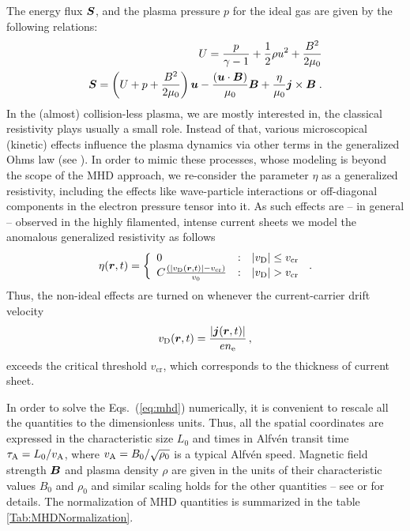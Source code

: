 The energy flux $\boldsymbol{S}$, and the plasma pressure $p$ for the ideal gas are given by the following relations:
\begin{eqnarray}
U=\frac{p}{\gamma-1}+\frac{1}{2}\rho u^2+\frac{B^2}{2\mu_0}\\
\boldsymbol{S}=\left(U+p+\frac{B^2}{2\mu_0}\right)\boldsymbol{u}- \frac{(\boldsymbol{u}\cdot\boldsymbol{B})}{\mu_0}\boldsymbol{B}+\frac{\eta}{\mu_0}\boldsymbol{j}\times\boldsymbol{B} \;.
\end{eqnarray}
In the (almost) collision-less plasma, we are mostly interested in, the classical resistivity plays usually a small role. Instead of that, various microscopical
(kinetic) effects influence the plasma dynamics via other terms in the generalized Ohms law (see \citet{Buchner+Elkina:2006}). In order to mimic these
processes, whose modeling is beyond the scope of the MHD approach, we re-consider the parameter $\eta$ as a generalized resistivity, including the effects like
wave-particle interactions or off-diagonal components in the electron pressure tensor into it. As such effects are -- in general -- observed in the highly
filamented, intense current sheets we model the anomalous generalized resistivity as follows
\begin{equation}
\eta(\vct r,t)=\left\{
  \begin{array}{lll}
    0 & : & |v_{\rm D}|\le v_\mathrm{cr}\\
    C\frac{\left(|v_{\rm D}(\vct r,t)|-v_\mathrm{cr}\right)}{v_0}& : &
    |v_{\rm D}|> v_\mathrm{cr}
  \end{array}
  \right.\,.
  \label{eq:eta}
\end{equation}
Thus, the non-ideal effects are turned on whenever the current-carrier drift velocity
\begin{equation}
 v_{\rm D}(\boldsymbol{r},t)=\frac{|\boldsymbol{j}(\boldsymbol{r},t)|}{e n_\mathrm{e}}\,,
\end{equation}
exceeds the critical threshold $v_\mathrm{cr}$, which corresponds to the thickness of current sheet.

In order to solve the Eqs.~(\ref{eq:mhd}) numerically, it is convenient to rescale all the quantities to the dimensionless units. Thus, all the spatial
coordinates are expressed in the characteristic size $L_0$ and times in Alfv\'en transit time $\tau_{\rm A}=L_0/v_{\rm A}$, where $v_{\rm A}=B_0/\sqrt{\rho_0}$
is a typical Alfv\'en speed. Magnetic field strength $\boldsymbol{B}$ and plasma density $\rho$ are given in the units of their characteristic values $B_0$ and $\rho_0$
and similar scaling holds for the other quantities -- see \citet{Kliem+:2000} or \citet{Barta+:2011a} for details. The normalization of MHD quantities is
summarized in the table \ref{Tab:MHDNormalization}.

